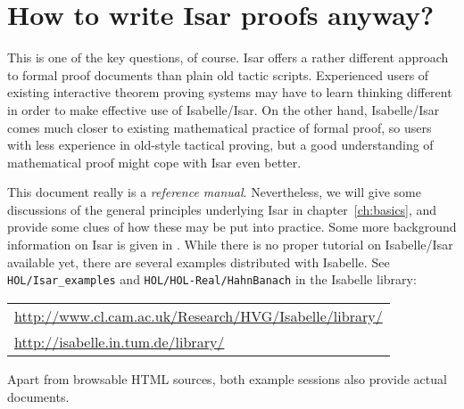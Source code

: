 \section{How to write Isar proofs anyway?}

This is one of the key questions, of course.  Isar offers a rather different
approach to formal proof documents than plain old tactic scripts.  Experienced
users of existing interactive theorem proving systems may have to learn
thinking different in order to make effective use of Isabelle/Isar.  On the
other hand, Isabelle/Isar comes much closer to existing mathematical practice
of formal proof, so users with less experience in old-style tactical proving,
but a good understanding of mathematical proof might cope with Isar even
better.

This document really is a \emph{reference manual}.  Nevertheless, we will give
some discussions of the general principles underlying Isar in
chapter~\ref{ch:basics}, and provide some clues of how these may be put into
practice.  Some more background information on Isar is given in
\cite{Wenzel:1999:TPHOL}.  While there is no proper tutorial on Isabelle/Isar
available yet, there are several examples distributed with Isabelle.  See
\texttt{HOL/Isar_examples} and \texttt{HOL/HOL-Real/HahnBanach} in the
Isabelle library:

\begin{center}\small
  \begin{tabular}{l}
    \url{http://www.cl.cam.ac.uk/Research/HVG/Isabelle/library/} \\
    \url{http://isabelle.in.tum.de/library/} \\
  \end{tabular}
\end{center}

Apart from browsable HTML sources, both example sessions also provide actual
documents.

